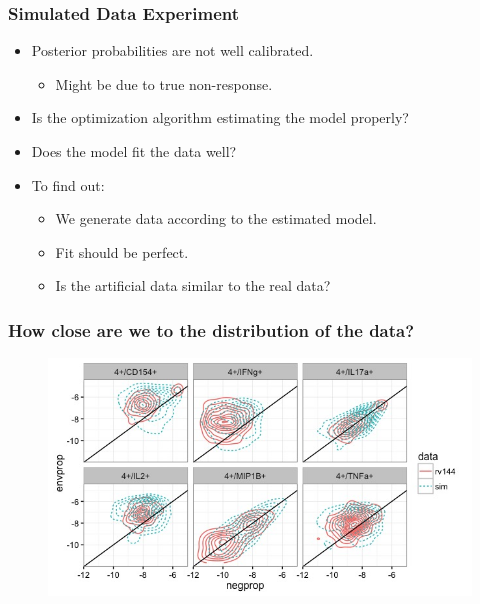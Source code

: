 \documentclass{beamer}
\theoremstyle{definition}
\begin{document}

\begin{frame}
\frametitle{Simulated Data Experiment}
\begin{itemize}
\item Posterior probabilities are not well calibrated.
	\begin{itemize}
	\item Might be due to true non-response.
	\end{itemize}
\pause
\vspace{0.5 cm}
\item Is the optimization algorithm estimating the model properly?
\vspace{0.5 cm}
\item Does the model fit the data well? 

\pause
\vspace{0.5 cm}
\item To find out:
	\begin{itemize}
	\item We generate data according to the estimated model.
	\item Fit should be perfect. 
	\item Is the artificial data similar to the real data?
	\end{itemize} 
\end{itemize}
\end{frame}


\begin{frame}
\frametitle{How close are we to the distribution of the data?}
\begin{figure}[]
\includegraphics[width=12 cm]{figures/simVsRealContour} 
\end{figure}
\end{frame}
\end{document}
